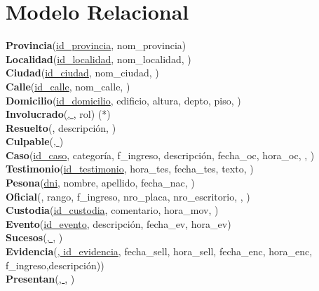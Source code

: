 \section{Modelo Relacional}

\par
\noindent \textbf{Provincia}(\underline{id\_provincia}, nom\_provincia) \\
\textbf{Localidad}(\underline{id\_localidad}, nom\_localidad, )\\
\textbf{Ciudad}(\underline{id\_ciudad}, nom\_ciudad, )\\
\textbf{Calle}(\underline{id\_calle}, nom\_calle, )\\
\textbf{Domicilio}(\underline{id\_domicilio}, edificio, altura, depto, piso, )\\
\textbf{Involucrado}(\underline{, }, rol) (*)\\
\textbf{Resuelto}(\underline{}, descripción, )\\
\textbf{Culpable}(\underline{, })\\
\textbf{Caso}(\underline{id\_caso}, categoría, f\_ingreso, descripción, fecha\_oc, hora\_oc, , )\\
\textbf{Testimonio}(\underline{id\_testimonio}, hora\_tes, fecha\_tes, texto, )\\
\textbf{Pesona}(\underline{dni}, nombre, apellido, fecha\_nac, )\\
\textbf{Oficial}(\underline{}, rango, f\_ingreso, nro\_placa, nro\_escritorio, , )\\
\textbf{Custodia}(\underline{id\_custodia}, comentario, hora\_mov, )\\
\textbf{Evento}(\underline{id\_evento}, descripción, fecha\_ev, hora\_ev)\\
\textbf{Sucesos}(\underline{, }, )\\
\textbf{Evidencia}(\underline{, id\_evidencia}, fecha\_sell, hora\_sell, fecha\_enc, hora\_enc, f\_ingreso,descripción))\\
\textbf{Presentan}(\underline{, }, )\\
